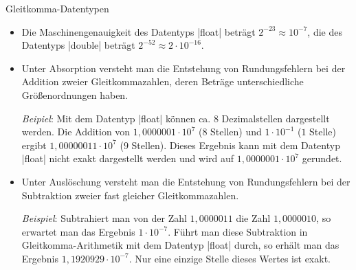 \begin{exercise}{Gleitkomma-Datentypen}
\begin{solution}
\begin{itemize}
\item
Die Maschinengenauigkeit des Datentyps \code|float| beträgt $2^{-23} \approx 10^{-7}$, die des Datentyps 
\code|double| beträgt $2^{-52} \approx 2 \cdot 10^{-16}$.

\item
Unter Absorption versteht man die Entstehung von Rundungsfehlern bei der Addition zweier Gleitkommazahlen, deren Beträge unterschiedliche Größenordnungen haben.

\emph{Beipiel}: Mit dem Datentyp \code|float| können ca{.} $8$ Dezimalstellen dargestellt werden. Die Addition von 
$1{,}0000001 \cdot 10^7$ ($8$ Stellen) und $1 \cdot 10^{-1}$ ($1$ Stelle) ergibt $1{,}00000011 \cdot 10^7$ ($9$ Stellen). Dieses Ergebnis kann mit dem Datentyp \code|float| nicht exakt dargestellt werden und wird 
auf $1{,}0000001 \cdot 10^7$ gerundet. 

\item
Unter Auslöschung versteht man die Entstehung von Rundungsfehlern bei der Subtraktion zweier fast gleicher Gleitkommazahlen.

\emph{Beispiel}: Subtrahiert man von der Zahl $1{,}0000011$ die Zahl $1{,}0000010$, so erwartet man das Ergebnis 
$1 \cdot 10^{-7}$. Führt man diese Subtraktion in Gleitkomma-Arithmetik mit dem Datentyp \code|float| durch, so erhält man das Ergebnis $1{,}1920929 \cdot 10^{-7}$. Nur eine einzige Stelle dieses Wertes ist exakt.

\end{itemize}
\end{solution}

\end{exercise}

